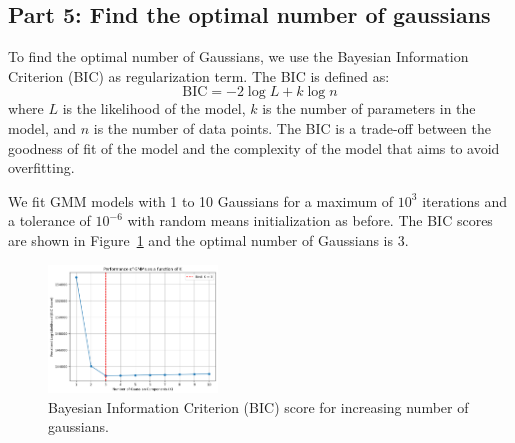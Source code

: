 \documentclass[a4paper]{article}
\begin{document}
\subsection*{Part 5: Find the optimal number of gaussians}

To find the optimal number of Gaussians, we use the Bayesian Information Criterion (BIC) as regularization term. The BIC is defined as:
\begin{equation}
  \text{BIC} = -2\log L + k\log n
\end{equation}
where $L$ is the likelihood of the model, $k$ is the number of parameters in the model, and $n$ is the number of data points.
The BIC is a trade-off between the goodness of fit of the model and the complexity of the model that aims to avoid overfitting.

We fit GMM models with 1 to 10 Gaussians for a maximum of $10^3$ iterations and a tolerance of $10^{-6}$ with random means initialization as before.
The BIC scores are shown in Figure~\ref{fig:gmm-eval} and the optimal number of Gaussians is 3.

\begin{figure}[htbp]
  \centering
  \includegraphics[width=0.4\textwidth]{images/gmms-eval.png}\caption{
    Bayesian Information Criterion (BIC) score for increasing number of gaussians.
  }\label{fig:gmm-eval}
\end{figure}
\end{document}
